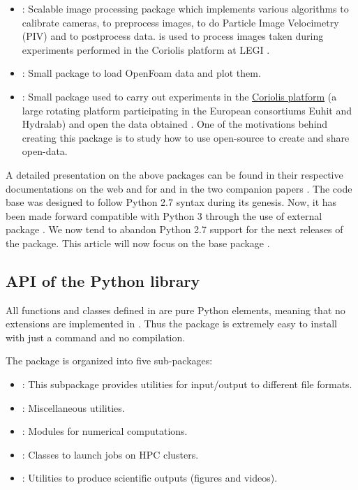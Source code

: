 \documentclass{../jors}
\begin{document}
\begin{itemize}
\item {}: Scalable image processing package which implements
various algorithms to calibrate cameras, to preprocess images, to do Particle
Image Velocimetry (PIV) and to postprocess data.
%
 is used to process images taken during experiments performed in the
Coriolis platform at LEGI \cite[]{ISSF2016}.

\item {}: Small package to load OpenFoam data and plot them.

\item {}: Small package used to carry out experiments in the
\href{http://www.legi.grenoble-inp.fr/web/spip.php?article757}{Coriolis platform}
(a large rotating platform participating in the European consortiums Euhit and
Hydralab) and open the data obtained \cite[see, for example,][]{ISSF2016}. One of
the motivations behind creating this package is to study how to use open-source to
create and share open-data.

\end{itemize}

A detailed presentation on the above packages can be found in their respective
documentations on the web and for  and  in the
two companion papers \cite[]{fluidfft, fluidsim}.
%
The code base was designed to follow Python 2.7 syntax during its genesis. Now,
it has been made forward compatible with Python 3 through the use of external
package .
%
We now tend to abandon Python 2.7 support for the next releases of the package.
%
This article will now focus on the base package \fluiddyn.

\subsection*{API of the Python library \fluiddyn}

All functions and classes defined in \fluiddyn are pure Python elements, meaning
that no extensions are implemented in \fluiddyn.  Thus the package \fluiddyn is
extremely easy to install with just a  command and no
compilation.

The package \fluiddyn is organized into five sub-packages:
\begin{itemize}
\item {}: This subpackage provides utilities for
input/output to different file formats.
\item {}: Miscellaneous utilities.
\item {}: Modules for numerical computations.
\item {}: Classes to launch jobs on HPC clusters.
\item {}: Utilities to produce scientific outputs
(figures and videos).
\end{itemize}
\end{document}
